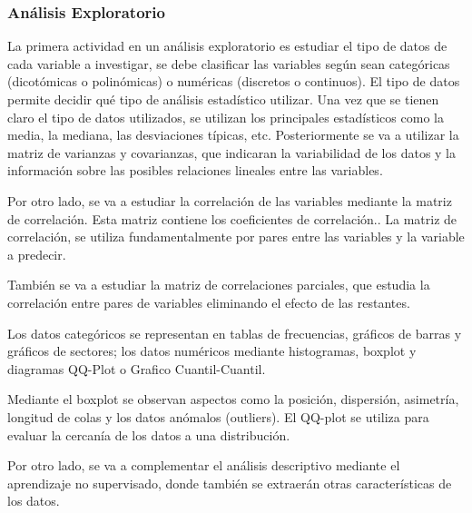 \subsubsection{Análisis Exploratorio}


La primera actividad en un análisis exploratorio es estudiar el tipo de datos de cada variable a investigar, se debe clasificar las variables según sean categóricas (dicotómicas o polinómicas) o numéricas (discretos o continuos). El tipo de datos permite decidir qué tipo de análisis estadístico utilizar.
Una vez que se tienen claro el tipo de datos utilizados, se utilizan los principales estadísticos como la media, la mediana, las desviaciones típicas, etc.
Posteriormente se va a utilizar la matriz de varianzas y covarianzas, que indicaran la variabilidad de los datos y la información sobre las posibles relaciones lineales entre las variables. 

Por otro lado, se va a estudiar la correlación de las variables mediante la matriz de correlación. Esta matriz contiene los coeficientes de correlación.\cite{JMMarin}. La matriz de correlación, se utiliza fundamentalmente por pares entre las variables y la variable a predecir.

También se va a estudiar la matriz de correlaciones parciales, que estudia la correlación entre pares de variables eliminando el efecto de las restantes.\cite{JMMarin}

Los datos categóricos se representan en tablas de frecuencias, gráficos de barras y gráficos de sectores; los datos numéricos mediante histogramas, boxplot y diagramas QQ-Plot o Grafico Cuantil-Cuantil. \cite{Orellana2001}

Mediante el boxplot se observan aspectos como la posición, dispersión, asimetría, longitud de colas y los datos anómalos (outliers). 
El QQ-plot se utiliza para evaluar la cercanía de los datos a una distribución. \cite{Orellana2001}

Por otro lado, se va a complementar el análisis descriptivo mediante el aprendizaje no supervisado, donde también se extraerán otras características de los datos.

